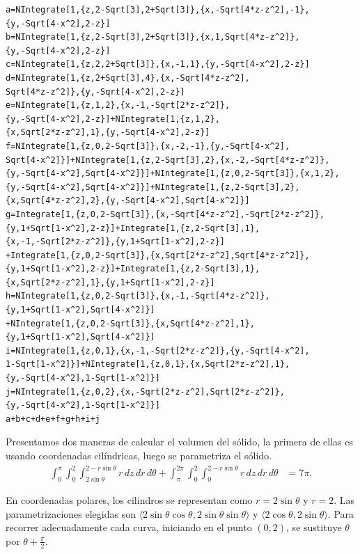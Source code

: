 \begin{tcolorbox}[title=\bf Instrucción en \verb"Mathematica"]\begin{Verbatim}[formatcom=\letraverbatim]
a=NIntegrate[1,{z,2-Sqrt[3],2+Sqrt[3]},{x,-Sqrt[4*z-z^2],-1},
{y,-Sqrt[4-x^2],2-z}]
b=NIntegrate[1,{z,2-Sqrt[3],2+Sqrt[3]},{x,1,Sqrt[4*z-z^2]},
{y,-Sqrt[4-x^2],2-z}]
c=NIntegrate[1,{z,2,2+Sqrt[3]},{x,-1,1},{y,-Sqrt[4-x^2],2-z}]
d=NIntegrate[1,{z,2+Sqrt[3],4},{x,-Sqrt[4*z-z^2],
Sqrt[4*z-z^2]},{y,-Sqrt[4-x^2],2-z}]
e=NIntegrate[1,{z,1,2},{x,-1,-Sqrt[2*z-z^2]},
{y,-Sqrt[4-x^2],2-z}]+NIntegrate[1,{z,1,2},
{x,Sqrt[2*z-z^2],1},{y,-Sqrt[4-x^2],2-z}]
f=NIntegrate[1,{z,0,2-Sqrt[3]},{x,-2,-1},{y,-Sqrt[4-x^2],
Sqrt[4-x^2]}]+NIntegrate[1,{z,2-Sqrt[3],2},{x,-2,-Sqrt[4*z-z^2]},
{y,-Sqrt[4-x^2],Sqrt[4-x^2]}]+NIntegrate[1,{z,0,2-Sqrt[3]},{x,1,2},
{y,-Sqrt[4-x^2],Sqrt[4-x^2]}]+NIntegrate[1,{z,2-Sqrt[3],2},
{x,Sqrt[4*z-z^2],2},{y,-Sqrt[4-x^2],Sqrt[4-x^2]}]
g=Integrate[1,{z,0,2-Sqrt[3]},{x,-Sqrt[4*z-z^2],-Sqrt[2*z-z^2]},
{y,1+Sqrt[1-x^2],2-z}]+Integrate[1,{z,2-Sqrt[3],1},
{x,-1,-Sqrt[2*z-z^2]},{y,1+Sqrt[1-x^2],2-z}]
+Integrate[1,{z,0,2-Sqrt[3]},{x,Sqrt[2*z-z^2],Sqrt[4*z-z^2]},
{y,1+Sqrt[1-x^2],2-z}]+Integrate[1,{z,2-Sqrt[3],1},
{x,Sqrt[2*z-z^2],1},{y,1+Sqrt[1-x^2],2-z}]
h=NIntegrate[1,{z,0,2-Sqrt[3]},{x,-1,-Sqrt[4*z-z^2]},
{y,1+Sqrt[1-x^2],Sqrt[4-x^2]}]
+NIntegrate[1,{z,0,2-Sqrt[3]},{x,Sqrt[4*z-z^2],1},
{y,1+Sqrt[1-x^2],Sqrt[4-x^2]}]
i=NIntegrate[1,{z,0,1},{x,-1,-Sqrt[2*z-z^2]},{y,-Sqrt[4-x^2],
1-Sqrt[1-x^2]}]+NIntegrate[1,{z,0,1},{x,Sqrt[2*z-z^2],1},
{y,-Sqrt[4-x^2],1-Sqrt[1-x^2]}]
j=NIntegrate[1,{z,0,2},{x,-Sqrt[2*z-z^2],Sqrt[2*z-z^2]},
{y,-Sqrt[4-x^2],1-Sqrt[1-x^2]}]
a+b+c+d+e+f+g+h+i+j
\end{Verbatim}
\end{tcolorbox}

Presentamos dos maneras de calcular el volumen del sólido, la primera de ellas es usando coordenadas cilíndricas, luego se parametriza el sólido.
\begin{align*}
\int_0^{\pi} \int_0^2 \int_{2 \sin \theta}^{2 - r \sin \theta} r\,dz\,dr\,d\theta
+
\int_{\pi}^{2\pi} \int_0^2 \int_0^{2 - r \sin \theta} r\,dz\,dr\,d\theta &= 7\pi.
\end{align*}

En coordenadas polares, los cilindros se representan como
{\small $r=2\sin \theta$} y {\small $r=2$.} Las parametrizaciones elegidas son
{\small $\langle 2\sin \theta \cos \theta , 2\sin \theta\sin \theta \rangle$} y {\small $\langle 2 \cos \theta , 2\sin \theta \rangle$.}
Para recorrer adecuadamente cada curva, iniciando en el punto $(0,2)$, se sustituye $\theta$ por $\theta + \frac{\pi}{2}$.

